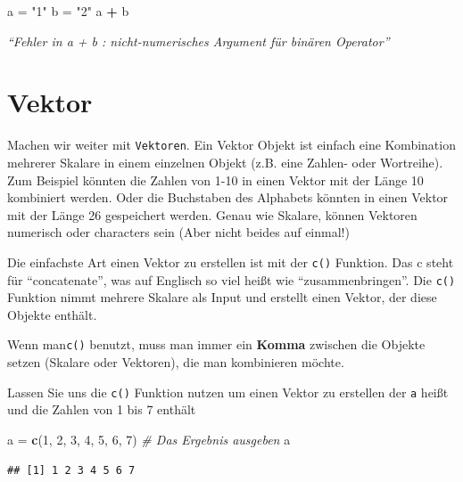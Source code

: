 \documentclass[
]{book}
\newenvironment{Shaded}{\begin{snugshade}}{\end{snugshade}}
\newcommand{\CommentTok}[1]{\textcolor[rgb]{0.56,0.35,0.01}{\textit{#1}}}
\newcommand{\DecValTok}[1]{\textcolor[rgb]{0.00,0.00,0.81}{#1}}
\newcommand{\FunctionTok}[1]{\textcolor[rgb]{0.13,0.29,0.53}{\textbf{#1}}}
\newcommand{\NormalTok}[1]{#1}
\newcommand{\OtherTok}[1]{\textcolor[rgb]{0.56,0.35,0.01}{#1}}
\newcommand{\SpecialCharTok}[1]{\textcolor[rgb]{0.81,0.36,0.00}{\textbf{#1}}}
\newcommand{\StringTok}[1]{\textcolor[rgb]{0.31,0.60,0.02}{#1}}
\begin{document}
\begin{Shaded}
\begin{Highlighting}[]
\NormalTok{a }\OtherTok{=} \StringTok{"1"}
\NormalTok{b }\OtherTok{=} \StringTok{"2"}
\NormalTok{a }\SpecialCharTok{+}\NormalTok{ b}
\end{Highlighting}
\end{Shaded}

\emph{``Fehler in a + b : nicht-numerisches Argument für binären Operator''}

\section{Vektor}\label{vektor}

Machen wir weiter mit \texttt{Vektoren}. Ein Vektor Objekt ist einfach eine Kombination mehrerer Skalare in einem einzelnen Objekt (z.B. eine Zahlen- oder Wortreihe).
Zum Beispiel könnten die Zahlen von 1-10 in einen Vektor mit der Länge 10 kombiniert werden. Oder die Buchstaben des Alphabets könnten in einen Vektor mit der Länge 26 gespeichert werden. Genau wie Skalare, können Vektoren numerisch oder characters sein (Aber nicht beides auf einmal!)

Die einfachste Art einen Vektor zu erstellen ist mit der \texttt{c()} Funktion. Das c steht für ``concatenate'', was auf Englisch so viel heißt wie ``zusammenbringen''. Die \texttt{c()} Funktion nimmt mehrere Skalare als Input und erstellt einen Vektor, der diese Objekte enthält.

Wenn man\texttt{c()} benutzt, muss man immer ein \textbf{Komma} zwischen die Objekte setzen (Skalare oder Vektoren), die man kombinieren möchte.

Lassen Sie uns die \texttt{c()} Funktion nutzen um einen Vektor zu erstellen der \texttt{a} heißt und die Zahlen von 1 bis 7 enthält

\begin{Shaded}
\begin{Highlighting}[]
\NormalTok{a }\OtherTok{=} \FunctionTok{c}\NormalTok{(}\DecValTok{1}\NormalTok{, }\DecValTok{2}\NormalTok{, }\DecValTok{3}\NormalTok{, }\DecValTok{4}\NormalTok{, }\DecValTok{5}\NormalTok{, }\DecValTok{6}\NormalTok{, }\DecValTok{7}\NormalTok{)}
\CommentTok{\# Das Ergebnis ausgeben}
\NormalTok{a}
\end{Highlighting}
\end{Shaded}

\begin{verbatim}
## [1] 1 2 3 4 5 6 7
\end{verbatim}
\end{document}
